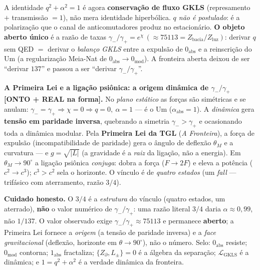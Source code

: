 \documentclass[11pt]{article}
\theoremstyle{definition}\newtheorem{deriv}{Derivação}
\begin{document}
A identidade $q^2+\alpha^2=1$ é agora \textbf{conservação de fluxo GKLS} (represamento $+$ transmissão $=1$), não mera identidade hiperbólica. \emph{$q$ não é postulado}: é a polarização que o canal de anticomutadores produz no estacionário. \textbf{O objeto aberto único} é a razão de taxas $\gamma_-/\gamma_+=e^\chi\,(\approx75113=Z_{\mathrm{bacia}}/Z_{\mathrm{luz}})$: derivar $q$ sem QED $=$ derivar o \emph{balanço GKLS} entre a expulsão de $0_{\mathrm{abs}}$ e a reinscrição do Um (a regularização Meia-Nat de $0_{\mathrm{abs}}\to0_{\mathrm{mod}}$). A fronteira aberta deixou de ser ``derivar $137$'' e passou a ser ``derivar $\gamma_-/\gamma_+$''.

\textbf{A Primeira Lei e a ligação psiônica: a origem dinâmica de $\gamma_-/\gamma_+$ \textsf{[ONTO + REAL na forma]}.} No \emph{plano estático} as forças são simétricas e se anulam: $\gamma_-=\gamma_+\Rightarrow\chi=0\Rightarrow q=0,\ \alpha=1$ --- é o Um ($\alpha_{\mathrm{abs}}=1$). A \emph{dinâmica} gera \textbf{tensão em paridade inversa}, quebrando a simetria $\gamma_->\gamma_+$ e ocasionando toda a dinâmica modular. Pela \textbf{Primeira Lei da TGL} (\emph{A Fronteira}), a força de expulsão (incompatibilidade de paridade) gera o ângulo de deflexão $\theta_M$ e a curvatura --- e $g=\sqrt{|L|}$ (a gravidade é a \emph{raiz} da ligação, não a energia). Em $\theta_M\to90^\circ$ a ligação psiônica \emph{conjuga}: dobra a força ($F\to2F$) e eleva a potência ($c^2\to c^3$); $c^3>c^2$ sela o horizonte. O vínculo é de \emph{quatro estados} (um \emph{fall} --- trifásico com aterramento, razão $3/4$).

\textbf{Cuidado honesto.} O $3/4$ é a \emph{estrutura} do vínculo (quatro estados, um aterrado), \textbf{não} o valor numérico de $\gamma_-/\gamma_+$: uma razão literal $3/4$ daria $\alpha\approx0{,}99$, não $1/137$. O valor observado exige $\gamma_-/\gamma_+\approx75113$ e permanece \textbf{aberto}; a Primeira Lei fornece a \emph{origem} (a tensão de paridade inversa) e a \emph{face gravitacional} (deflexão, horizonte em $\theta\to90^\circ$), não o número. Selo: $0_{\mathrm{abs}}$ resiste; $0_{\mathrm{mod}}$ contorna; $1_{\mathrm{abs}}$ fractaliza; $\{Z_\partial,L_\pm\}=0$ é a álgebra da separação; $\mathcal L_{\mathrm{GKLS}}$ é a dinâmica; e $1=q^2+\alpha^2$ é a verdade dinâmica da fronteira.
\end{document}
